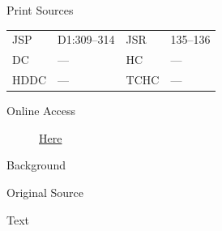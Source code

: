 			\begin{description}
				\item[Print Sources]
			\end{description}

				\begin{tabular}{p{0.5in}p{1in}p{0.5in}p{1in}}
				JSP	 	& D1:309--314	& JSR 		& 135--136 \\
				DC	 	& ---		 	& HC 		& --- \\
				HDDC 	& ---			& TCHC 		& --- \\
				\end{tabular}
			
			\begin{description}
				\item[Online Access] \href{https://www.josephsmithpapers.org/paper-summary/revelation-15-may-1831/1}{Here}
			\end{description}
			
			\begin{description}
				\item[Background]
			\end{description}
			
			
			\begin{description}
				\item[Original Source]
			\end{description}
			
			
			\begin{description}
				\item[Text]
			\end{description}
			
